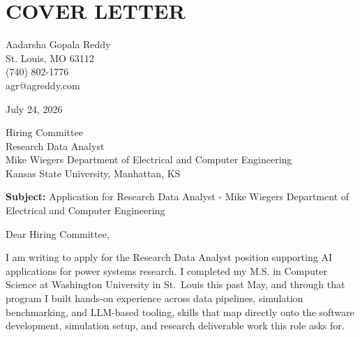 \documentclass[10pt, letterpaper]{article}
\begin{document}
\vspace{\headerSpacing}
\section*{COVER LETTER}

\vspace{\headerSpacing}
\begin{onecolentry}
	Aadarsha Gopala Reddy\\
	St. Louis, MO 63112\\
	(740) 802-1776\\
	agr@agreddy.com\\
\end{onecolentry}

\vspace{\headerSpacing}
\begin{onecolentry}
	July 24, 2026\\
\end{onecolentry}

\vspace{\headerSpacing}
\begin{onecolentry}
	Hiring Committee\\
	Research Data Analyst\\
	Mike Wiegers Department of Electrical and Computer Engineering\\
	Kansas State University, Manhattan, KS\\
\end{onecolentry}

\vspace{\headerSpacing}
\begin{onecolentry}
	\textbf{Subject:} Application for Research Data Analyst - Mike Wiegers Department of Electrical and Computer Engineering
\end{onecolentry}

\vspace{\headerSpacing}
\begin{onecolentry}
	Dear Hiring Committee,
\end{onecolentry}

\vspace{\headerSpacing}
\begin{onecolentry}
	I am writing to apply for the Research Data Analyst position supporting AI applications for power systems research. I completed my M.S. in Computer Science at Washington University in St.~Louis this past May, and through that program I built hands-on experience across data pipelines, simulation benchmarking, and LLM-based tooling, skills that map directly onto the software development, simulation setup, and research deliverable work this role asks for.
\end{onecolentry}
\end{document}
